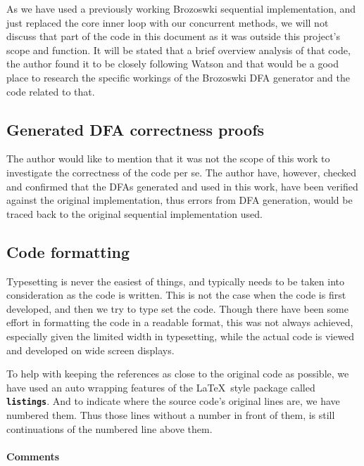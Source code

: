 As we have used a previously working Brozoswki sequential
implementation, and just replaced the core inner loop with our
concurrent methods, we will not discuss that part of the code in this
document as it was outside this project's scope and function. It will
be stated that a brief overview analysis of that code, the author
found it to be closely following Watson\cite{watson1995taxonomies} and
that would be a good place to research the specific workings of the
Brozoswki DFA generator and the code related to that.

\subsection{Generated DFA correctness proofs}

The author would like to mention that it was not the scope of this
work to investigate the correctness of the code per se. The author
have, however, checked and confirmed that the DFAs generated and used
in this work, have been verified against the original implementation,
thus errors from DFA generation, would be traced back to the original
sequential implementation used.

\subsection{Code formatting}
\label{sec:code-formatting}

Typesetting is never the easiest of things, and typically needs to be
taken into consideration as the code is written. This is not the case
when the code is first developed, and then we try to type set the
code. Though there have been some effort in formatting the code in a
readable format, this was not always achieved, especially given the
limited width in typesetting, while the actual code is viewed and
developed on wide screen displays.

To help with keeping the references as close to the original code as
possible, we have used an auto wrapping features of the \LaTeX\ style
package called \texttt{\textbf{listings}}. And to indicate where the
source code's original lines are, we have numbered them. Thus those
lines without a number in front of them, is still continuations of the
numbered line above them.

\paragraph{Comments}
\label{sec:comments}

